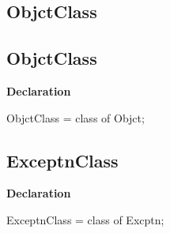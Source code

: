 \documentclass{report}
\newif\ifpdf
\begin{document}
\subsection*{\large{\textbf{ObjctClass}}\normalsize\hspace{1ex}\hrulefill}
\else
\subsection*{ObjctClass}
\fi
\label{NewPascal.Base-ObjctClass}
\begin{list}{}{
\setlength{\itemindent}{0cm}
\setlength{\listparindent}{0cm}
\setlength{\leftmargin}{\evensidemargin}
\addtolength{\leftmargin}{\tmplength}
\settowidth{\labelsep}{X}
\addtolength{\leftmargin}{\labelsep}
\setlength{\labelwidth}{\tmplength}
}
\item[\textbf{Declaration}\hfill]
\ifpdf
\begin{flushleft}
\fi
\begin{ttfamily}
ObjctClass = class of Objct;\end{ttfamily}

\ifpdf
\end{flushleft}
\fi

\end{list}
\ifpdf
\subsection*{\large{\textbf{ExceptnClass}}\normalsize\hspace{1ex}\hrulefill}
\else
\subsection*{ExceptnClass}
\fi
\label{NewPascal.Base-ExceptnClass}
\begin{list}{}{
\setlength{\itemindent}{0cm}
\setlength{\listparindent}{0cm}
\setlength{\leftmargin}{\evensidemargin}
\addtolength{\leftmargin}{\tmplength}
\settowidth{\labelsep}{X}
\addtolength{\leftmargin}{\labelsep}
\setlength{\labelwidth}{\tmplength}
}
\item[\textbf{Declaration}\hfill]
\ifpdf
\begin{flushleft}
\fi
\begin{ttfamily}
ExceptnClass = class of Excptn;\end{ttfamily}

\ifpdf
\end{flushleft}
\fi

\end{list}
\ifpdf
\end{document}
